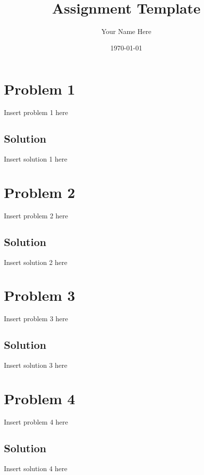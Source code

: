 \documentclass[11pt]{article}
\title{Assignment Template}
\author{Your Name Here}
\date{\today}
\begin{document}
\maketitle

\section{Problem 1} %
Insert problem 1 here

\subsection*{Solution}
Insert solution 1 here

\newpage
\section{Problem 2} %
Insert problem 2 here

\subsection*{Solution}
Insert solution 2 here

\newpage
\section{Problem 3} %
Insert problem 3 here

\subsection*{Solution}
Insert solution 3 here

\newpage
\section{Problem 4} %
Insert problem 4 here

\subsection*{Solution}
Insert solution 4 here
\end{document}
